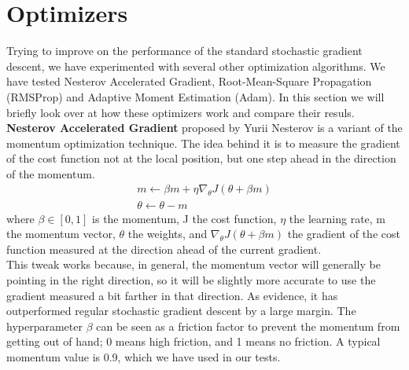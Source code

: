 \section{Optimizers}
Trying to improve on the performance of the standard stochastic gradient descent, we have experimented with several other optimization algorithms. We have tested Nesterov Accelerated Gradient, Root-Mean-Square Propagation (RMSProp) and Adaptive Moment Estimation (Adam). In this section we will briefly look over at how these optimizers work and compare their resuls.\\
\textbf{Nesterov Accelerated Gradient} proposed by Yurii Nesterov\cite{nesterov} is a variant of the momentum optimization technique. The idea behind it is to measure the gradient of the cost function not at the local position, but one step ahead in the direction of the momentum.\\
\begin{gather}
m \leftarrow \beta m + \eta \nabla_\theta J(\theta+\beta m) \\
\theta \leftarrow \theta - m
\end{gather}
where $\beta \in [0,1]$ is the momentum, J the cost function, $\eta$ the learning rate, m the momentum vector, $\theta$ the weights, and $\nabla_\theta J(\theta+\beta m)$ the gradient of the cost function measured at the direction ahead of the current gradient.\\
This tweak works because, in general, the momentum vector will generally be pointing in the right direction, so it will be slightly more accurate to use the gradient measured a bit farther in that direction. As evidence, it has outperformed regular stochastic gradient descent by a large margin. The hyperparameter $\beta$ can be seen as a friction factor to prevent the momentum from getting out of hand; 0 means high friction, and 1 means no friction. A typical momentum value is 0.9, which we have used in our tests.

